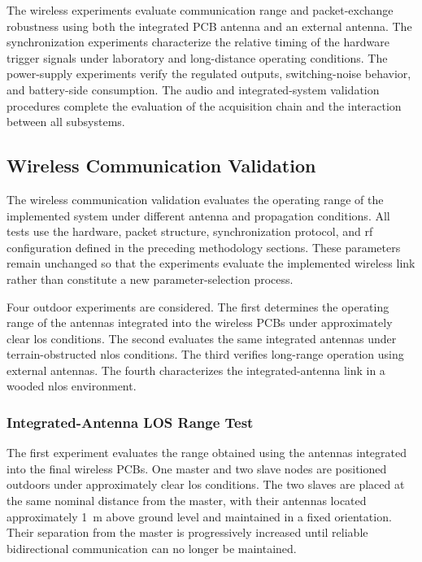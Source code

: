 The wireless experiments evaluate communication range and packet-exchange robustness using both the integrated PCB antenna and an external antenna. The synchronization experiments characterize the relative timing of the hardware trigger signals under laboratory and long-distance operating conditions. The power-supply experiments verify the regulated outputs, switching-noise behavior, and battery-side consumption. The audio and integrated-system validation procedures complete the evaluation of the acquisition chain and the interaction between all subsystems.

\subsection{Wireless Communication Validation}
\label{sec:wireless_validation}

The wireless communication validation evaluates the operating range of the implemented system under different antenna and propagation conditions. All tests use the hardware, packet structure, synchronization protocol, and \acrshort{rf} configuration defined in the preceding methodology sections. These parameters remain unchanged so that the experiments evaluate the implemented wireless link rather than constitute a new parameter-selection process.

Four outdoor experiments are considered. The first determines the operating range of the antennas integrated into the wireless PCBs under approximately clear \acrshort{los} conditions. The second evaluates the same integrated antennas under terrain-obstructed \acrshort{nlos} conditions. The third verifies long-range operation using external antennas. The fourth characterizes the integrated-antenna link in a wooded \acrshort{nlos} environment.


\subsubsection{Integrated-Antenna LOS Range Test}

The first experiment evaluates the range obtained using the antennas integrated into the final wireless PCBs. One master and two slave nodes are positioned outdoors under approximately clear \acrshort{los} conditions. The two slaves are placed at the same nominal distance from the master, with their antennas located approximately 1~m above ground level and maintained in a fixed orientation. Their separation from the master is progressively increased until reliable bidirectional communication can no longer be maintained.

